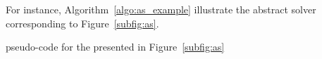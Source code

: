 For instance, Algorithm~\ref{algo:as_example} illustrate the abstract solver corresponding to Figure~\ref{subfig:as}.

\begin{algorithm}[H]
\dontprintsemicolon
\SetNoline
{}
\caption{\posl{} pseudo-code for the \as{} presented in Figure~\ref{subfig:as}}\label{algo:as_example}
\end{algorithm}	


